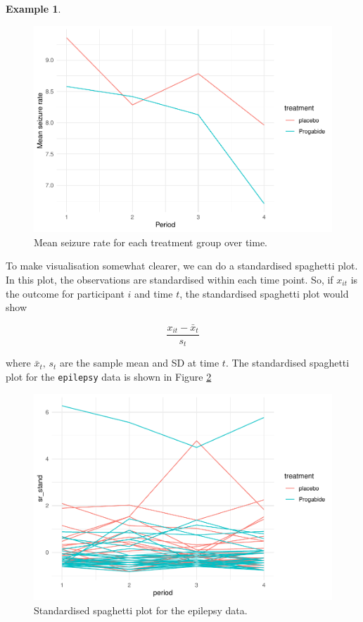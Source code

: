 \documentclass[
  openany]{book}
\theoremstyle{definition}
\theoremstyle{definition}
\newtheorem{example}{Example}[chapter]
\theoremstyle{definition}
\theoremstyle{definition}
\theoremstyle{remark}
\begin{document}
\begin{example}
\begin{figure}
\centering
\includegraphics{CT4H_notes_files/figure-latex/epimeans-1.pdf}
\caption{\label{fig:epimeans}Mean seizure rate for each treatment group over time.}
\end{figure}

To make visualisation somewhat clearer, we can do a standardised spaghetti plot. In this plot, the observations are standardised within each time point. So, if \(x_{it}\) is the outcome for participant \(i\) and time \(t\), the standardised spaghetti plot would show

\[\frac{x_{it} - \bar{x}_t}{s_t} \]

where \(\bar{x}_t,\,s_t\) are the sample mean and SD at time \(t\). The standardised spaghetti plot for the \texttt{epilepsy} data is shown in Figure \ref{fig:standepi}

\begin{figure}
\centering
\includegraphics{CT4H_notes_files/figure-latex/standepi-1.pdf}
\caption{\label{fig:standepi}Standardised spaghetti plot for the epilepsy data.}
\end{figure}

\end{example}
\end{document}
